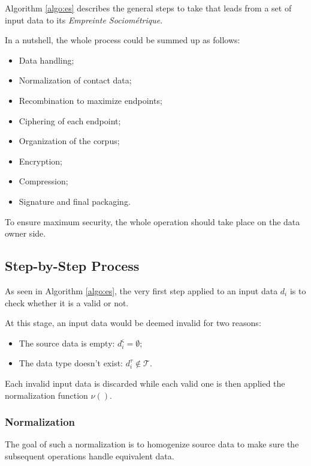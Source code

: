 \documentclass[twoside,twocolumn]{article}
\theoremstyle{definition}
\theoremstyle{remark}
\begin{document}
Algorithm \ref{algo:es} describes the general steps to take that leads from a set of input data to its \emph{Empreinte Sociométrique}.

In a nutshell, the whole process could be summed up as follows:
\begin{itemize}
    \item Data handling;
    \item Normalization of contact data;
    \item Recombination to maximize endpoints;
    \item Ciphering of each endpoint;
    \item Organization of the corpus;
    \item Encryption;
    \item Compression;
    \item Signature and final packaging.
\end{itemize}

To ensure maximum security, the whole operation should take place on the data owner side.

\subsection{Step-by-Step Process}

As seen in Algorithm \ref{algo:es}, the very first step applied to an input data $d_i$ is to check whether it is a valid or not.

At this stage, an input data would be deemed invalid for two reasons:
\begin{itemize}
    \item The source data is empty: $d_i^\varsigma = \emptyset$;
    \item The data type doesn't exist: $d_i^\tau \not\in \mathcal{T}$.
\end{itemize}

Each invalid input data is discarded while each valid one is then applied the normalization function $\nu()$.

\subsubsection{Normalization}

The goal of such a normalization is to homogenize source data to make sure the subsequent operations handle equivalent data.
\end{document}
